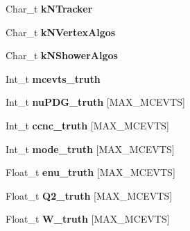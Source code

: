 \begin{DoxyCompactItemize}
\item 
\hypertarget{classanatree_a264df42fa5b588baa256455dbb47c3bc}{Char\-\_\-t {\bfseries k\-N\-Tracker}}\label{classanatree_a264df42fa5b588baa256455dbb47c3bc}

\item 
\hypertarget{classanatree_a8596cc9fc78a3472c2a2a3a5c02416a8}{Char\-\_\-t {\bfseries k\-N\-Vertex\-Algos}}\label{classanatree_a8596cc9fc78a3472c2a2a3a5c02416a8}

\item 
\hypertarget{classanatree_ac201bf34b5fd39da28bf942d8e8be027}{Char\-\_\-t {\bfseries k\-N\-Shower\-Algos}}\label{classanatree_ac201bf34b5fd39da28bf942d8e8be027}

\item 
\hypertarget{classanatree_a6348c95823d70c20e4d6ab3d34dc2de5}{Int\-\_\-t {\bfseries mcevts\-\_\-truth}}\label{classanatree_a6348c95823d70c20e4d6ab3d34dc2de5}

\item 
\hypertarget{classanatree_aac578b86329edeeacd7f7e06ace2db3d}{Int\-\_\-t {\bfseries nu\-P\-D\-G\-\_\-truth} \mbox{[}M\-A\-X\-\_\-\-M\-C\-E\-V\-T\-S\mbox{]}}\label{classanatree_aac578b86329edeeacd7f7e06ace2db3d}

\item 
\hypertarget{classanatree_a6c7d45b54cae3303a0c9d3a3c15fdbd9}{Int\-\_\-t {\bfseries ccnc\-\_\-truth} \mbox{[}M\-A\-X\-\_\-\-M\-C\-E\-V\-T\-S\mbox{]}}\label{classanatree_a6c7d45b54cae3303a0c9d3a3c15fdbd9}

\item 
\hypertarget{classanatree_a2b1b523907fd085abfcb6aeb0f82dadd}{Int\-\_\-t {\bfseries mode\-\_\-truth} \mbox{[}M\-A\-X\-\_\-\-M\-C\-E\-V\-T\-S\mbox{]}}\label{classanatree_a2b1b523907fd085abfcb6aeb0f82dadd}

\item 
\hypertarget{classanatree_a6f3505ccdf24488e22547b6485d477cc}{Float\-\_\-t {\bfseries enu\-\_\-truth} \mbox{[}M\-A\-X\-\_\-\-M\-C\-E\-V\-T\-S\mbox{]}}\label{classanatree_a6f3505ccdf24488e22547b6485d477cc}

\item 
\hypertarget{classanatree_a3c9eaf70951f28690366c3144b0ff70c}{Float\-\_\-t {\bfseries Q2\-\_\-truth} \mbox{[}M\-A\-X\-\_\-\-M\-C\-E\-V\-T\-S\mbox{]}}\label{classanatree_a3c9eaf70951f28690366c3144b0ff70c}

\item 
\hypertarget{classanatree_a7c673c2c1884a790915de695cb5ce116}{Float\-\_\-t {\bfseries W\-\_\-truth} \mbox{[}M\-A\-X\-\_\-\-M\-C\-E\-V\-T\-S\mbox{]}}\label{classanatree_a7c673c2c1884a790915de695cb5ce116}


\end{DoxyCompactItemize}
